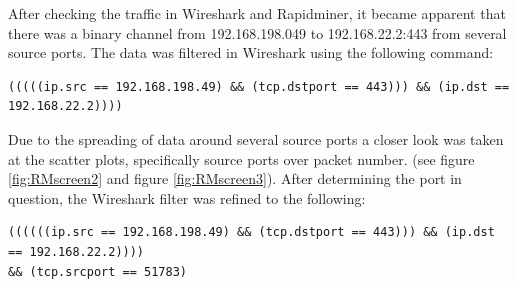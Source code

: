 \documentclass{article}
\begin{document}
After checking the traffic in Wireshark and Rapidminer, it became apparent that there was a binary channel from 192.168.198.049 to 192.168.22.2:443 from several source ports. The data was filtered in Wireshark using the following command:
\begin{verbatim}
(((((ip.src == 192.168.198.49) && (tcp.dstport == 443))) && (ip.dst == 192.168.22.2))))
\end{verbatim}

Due to the spreading of data around several source ports a closer look was taken at the scatter plots, specifically source ports over packet number. (see figure \ref{fig:RMscreen2} and figure \ref{fig:RMscreen3}). After determining the port in question, the Wireshark filter was refined to the following:
\begin{verbatim}
((((((ip.src == 192.168.198.49) && (tcp.dstport == 443))) && (ip.dst == 192.168.22.2)))) 
&& (tcp.srcport == 51783)
\end{verbatim}
\end{document}
